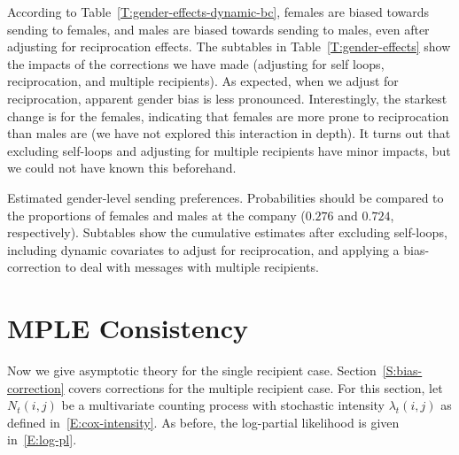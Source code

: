 \documentclass[aoas,preprint]{imsart}
\begin{document}
According to Table~\ref{T:gender-effects-dynamic-bc}, females are biased
towards sending to females, and males are biased towards sending to
males, even after adjusting for reciprocation effects.  The subtables in
Table~\ref{T:gender-effects} show the impacts of the corrections we have
made (adjusting for self loops, reciprocation, and multiple recipients).
As expected, when we adjust for reciprocation, apparent gender bias is less
pronounced.  Interestingly, the starkest change is for the females,
indicating that females are more prone to reciprocation than males are
(we have not explored this interaction in depth).  It turns out that excluding
self-loops and adjusting for multiple recipients have minor impacts, but we
could not have known this beforehand.

\begin{table}[h]
    \label{T:gender-effects}
    \subtable[Na\"{i}ve Estimates]{
        
        \label{T:gender-effects-naive}
    }
    \caption{
        Estimated gender-level sending preferences.  Probabilities
        should be compared to the proportions of females and males
        at the company ($0.276$ and $0.724$, respectively).  Subtables
        show the cumulative estimates after excluding self-loops,
        including dynamic covariates to adjust for reciprocation, and
        applying a bias-correction to deal with messages with multiple
        recipients.
    }
\end{table}


\section{MPLE Consistency}\label{S:MPLE-consistency}

Now we give asymptotic theory for the single recipient case.  
Section~\ref{S:bias-correction} covers corrections for the multiple recipient
case.  For this section, let $N_t(i,j)$ be a multivariate counting process with
stochastic intensity $\lambda_t(i,j)$ as defined in~\eqref{E:cox-intensity}.
As before, the log-partial likelihood is given in~\eqref{E:log-pl}.
\end{document}
